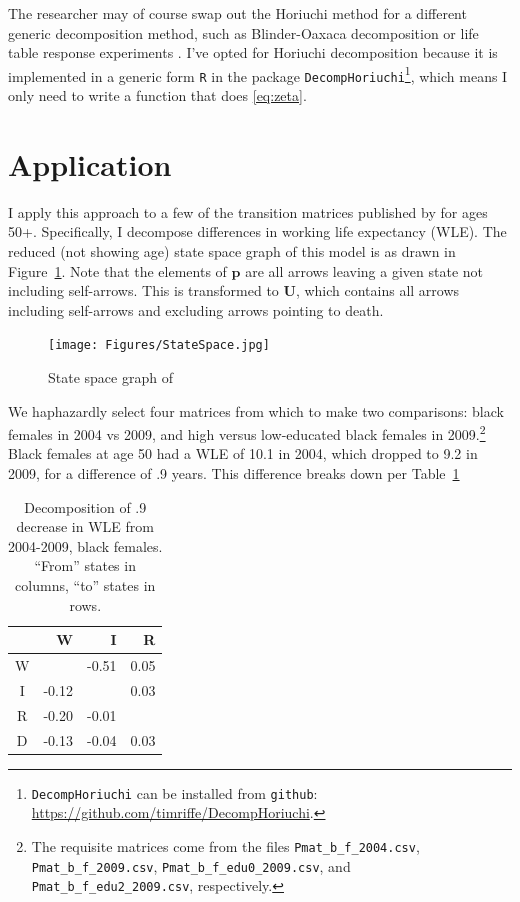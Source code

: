 \documentclass{article}
\begin{document}
The researcher may of course swap out the Horiuchi method for a different
generic decomposition method, such as Blinder-Oaxaca decomposition
\citep{blinder1973wage, oaxaca1973male} or life table response experiments
\citep{caswell1989analysis}. I've opted for Horiuchi decomposition because it is
implemented in a generic form \texttt{R} in the package
\texttt{DecompHoriuchi}\footnote{\texttt{DecompHoriuchi} can be installed from
\texttt{github}: \url{https://github.com/timriffe/DecompHoriuchi}.}, which means
I only need to write a function that does \eqref{eq:zeta}.



\section{Application}
I apply this approach to a few of the transition matrices published
by \citet{Dudel2017} for ages 50+. Specifically, I decompose differences in
working life expectancy (WLE). The reduced (not showing
age) state space graph of this model is as drawn in Figure~\ref{fig:dudelstates}. Note that the elements of $\textbf{p}$ are all arrows leaving a given state not including self-arrows. This is transformed to $\textbf{U}$, which contains all
arrows including self-arrows and excluding arrows pointing to death. 

\begin{figure}[ht!]
\begin{center}
\caption{State space graph of \citet{Dudel2017}}
\label{fig:dudelstates}
\texttt{[image: Figures/StateSpace.jpg]}
\end{center}
\end{figure}

We haphazardly select four matrices from which to make two comparisons: black
females in 2004 vs 2009, and high versus low-educated black females in
2009.\footnote{The requisite matrices come from the files
\texttt{Pmat\_b\_f\_2004.csv}, \texttt{Pmat\_b\_f\_2009.csv}, \texttt{Pmat\_b\_f\_edu0\_2009.csv}, and
\texttt{Pmat\_b\_f\_edu2\_2009.csv}, respectively. } Black females at age 50 had
a WLE of 10.1 in 2004, which dropped to 9.2 in 2009, for a difference of .9
years. This difference breaks down per Table~\ref{tab:A}
\FloatBarrier
\begin{table}[ht]
\centering
\caption{Decomposition of .9 decrease in WLE from 2004-2009, black females.
``From'' states in columns, ``to'' states in rows.}
\label{tab:A}
\begin{tabular}{c|rrr}
 & W & I & R \\ 
  \hline
W &  & -0.51 & 0.05 \\ 
  I & -0.12 &  & 0.03 \\ 
  R & -0.20 & -0.01 &  \\ 
  D & -0.13 & -0.04 & 0.03 \\ 
   \hline
\end{tabular}
\end{table}
\end{document}
